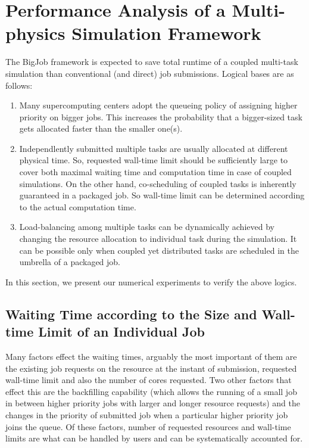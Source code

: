 \documentclass[preprint,12pt]{elsarticle}
\begin{document}
\section{Performance Analysis of a Multi-physics Simulation Framework}
\label{sec:performance}

The BigJob framework is expected to save total runtime of a coupled multi-task simulation 
than conventional (and direct) job submissions. Logical bases are as follows:
\begin{enumerate}
\item Many supercomputing centers adopt the queueing policy of 
assigning higher priority on bigger jobs. This increases the probability that
a bigger-sized task gets allocated faster than the smaller one(s).
\item Independlently submitted multiple tasks are usually allocated at different physical time.
So, requested wall-time limit should be sufficiently large to cover 
both maximal waiting time and computation time in case of coupled simulations.
On the other hand, co-scheduling of coupled tasks is inherently guaranteed
in a packaged job. So wall-time limit can be determined according to the actual computation time.
\item Load-balancing among multiple tasks can be dynamically achieved by
changing the resource allocation to individual task during the simulation.
It can be possible only when coupled yet distributed tasks are scheduled
in the umbrella of a packaged job.
\end{enumerate}

In this section, we present our numerical experiments to verify the above logics.


\subsection{Waiting Time according to the Size and Wall-time Limit of an Individual Job}
\label{sec:preliminary}

Many factors effect the waiting times, arguably the most important of them are
the existing job requests on the resource at the instant of submission,
requested wall-time limit and also the number of cores requested.
Two other factors that effect this are the backfilling capability (which allows 
the running of a small job in between higher priority jobs 
with larger and longer resource requests) and the changes
in the priority of submitted job when a particular higher priority job
joins the queue. Of these factors, number of requested resources and
wall-time limits are what can be handled by users and
can be systematically accounted for.
\end{document}
